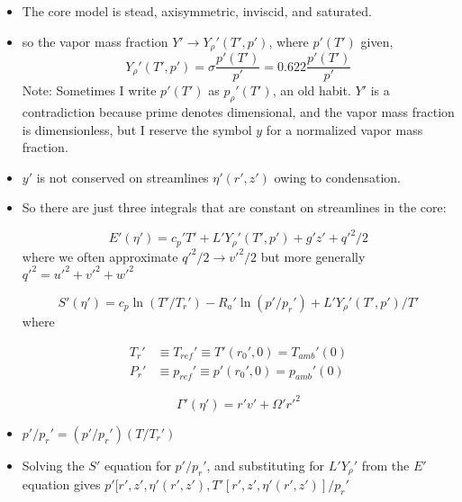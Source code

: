\documentclass[preprint, prX]{revtex4}
\begin{document}
\begin{itemize}
\item The core model is stead, axisymmetric, inviscid, and saturated.

\item so the vapor mass fraction $Y' \rightarrow Y_\rho'(T',p')$, where $p'(T')$ given,
\begin{equation}
	Y_\rho'(T',p') = \sigma \frac{p'(T')}{p'} = 0.622 \frac{p'(T')}{p'}
\end{equation}
Note: Sometimes I write $p'(T')$ as $p_\rho'(T')$, an old habit. $Y'$ is a contradiction because prime denotes dimensional, and the vapor mass fraction is dimensionless, but I reserve the symbol $y$ for a normalized vapor mass fraction.

\item $y'$ is not conserved on streamlines $\eta'(r',z')$ owing to condensation.

\item So there are just three integrals that are constant on streamlines in the core:

\begin{equation}
E'(\eta') = c_p' T' + L' Y_\rho'(T',p') + g'z' + q'^2/2
\end{equation}
where we often approximate $q'^2/2 \rightarrow v'^2/2$ but more generally $q'^2 = u'^2 + v'^2 + w'^2$

\begin{equation}
	S'(\eta') = c_p \ln(T' / T_r') - R_a' \ln(p'/p_r') + L'Y_\rho'(T',p')/T'
\end{equation}
where

\begin{equation}
\begin{split}
	T_r' & \equiv T_{ref}' \equiv T'(r_0', 0) = T_{amb}'(0) \\
	P_r' & \equiv p_{ref}' \equiv p'(r_0', 0) = p_{amb}'(0)
\end{split}	
\end{equation}

\begin{equation}
	\Gamma'(\eta') = r' v' + \Omega'r'^2
\end{equation}

\item $p'/p_r' = (p'/p_r')(T/T_r')$

\item Solving the $S'$ equation for $p'/p_r'$, and substituting for $L'Y_\rho'$ from the $E'$ equation gives $p'[r',z',\eta'(r',z'), T'[r',z',\eta'(r',z')]/p_r'$


\end{itemize}
\end{document}
